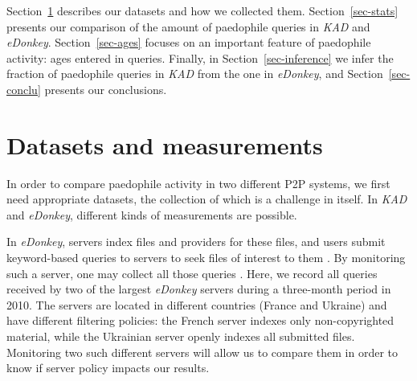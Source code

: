 \documentclass[a4paper,oneside,12pt]{article}
\newcommand{\edonkey}{{\em eDonkey}\xspace}
\newcommand{\kad}{{\em KAD}\xspace}
\begin{document}
Section~\ref{sec-data} describes our datasets and how we collected them. Section~\ref{sec-stats} presents our comparison of the amount of paedophile queries in \kad and \edonkey. Section~\ref{sec-ages} focuses on an important feature of paedophile activity: ages entered in queries. Finally, in Section~\ref{sec-inference} we infer the fraction of paedophile queries in \kad from the one in \edonkey, and Section~\ref{sec-conclu} presents our conclusions.

\section{Datasets and measurements}
\label{sec-data}

In order to compare paedophile activity in two different P2P systems, we first
need appropriate datasets, the collection of which is a challenge in itself. In
\kad and \edonkey, different kinds of measurements are possible.

In \edonkey, servers index files and providers for these files, and users submit keyword-based queries to servers to seek files of interest to them \cite{edonkey}. By monitoring such a server, one may collect all those queries \cite{tenweeks}. Here, we record all queries received by two of the largest \edonkey servers during a three-month period in 2010. The servers are located in different countries (France and Ukraine) and have different filtering policies: the French server indexes only non-copyrighted material, while the Ukrainian server openly indexes all submitted files. Monitoring two such different servers will allow us to compare them in order to know if server policy impacts our results.
\end{document}
